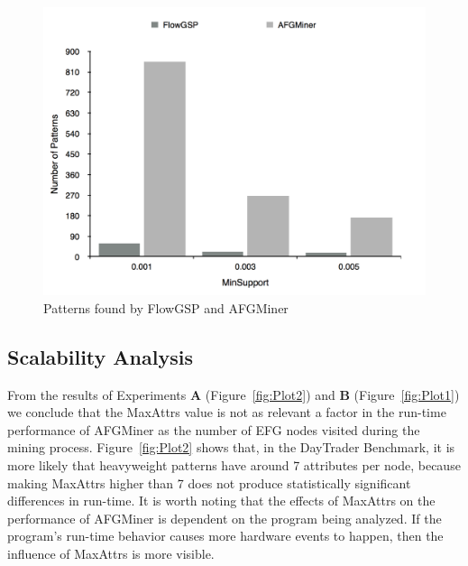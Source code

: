 \begin{figure}[h!]
\centering
    \includegraphics[scale=0.15]{figures/numPatternsComp.pdf}
    \caption{Patterns found by FlowGSP and AFGMiner}
    \label{fig:NumPatterns}
\end{figure}

\subsection{Scalability Analysis}
\label{subsec:Scalability}
From the results of Experiments {\bf A} (Figure~\ref{fig:Plot2}) and {\bf B} (Figure~\ref{fig:Plot1}) we conclude that the MaxAttrs value is not as relevant a factor in the run-time performance of AFGMiner as the number of EFG nodes visited during the mining process. Figure~\ref{fig:Plot2} shows that, in the DayTrader Benchmark, it is more likely that heavyweight patterns have around 7 attributes per node, because making MaxAttrs higher than 7 does not produce statistically significant differences in run-time. It is worth noting that the effects of MaxAttrs on the performance of AFGMiner is dependent on the program being analyzed. If the program's run-time behavior causes more hardware events to happen, then the influence of MaxAttrs is more visible.

